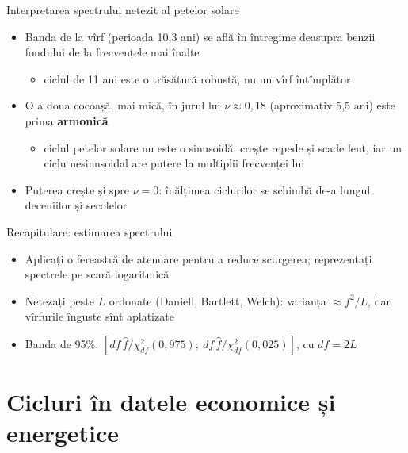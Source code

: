 \begin{frame}{Interpretarea spectrului netezit al petelor solare}
\itemsize{\small}
\begin{itemize}
    \item Banda de la vîrf (perioada 10{,}3 ani) se află în întregime deasupra benzii fondului de la frecvențele mai înalte
    \begin{itemize}
        \item ciclul de 11 ani este o trăsătură robustă, nu un vîrf întîmplător
    \end{itemize}
    \item O a doua cocoașă, mai mică, în jurul lui $\nu \approx 0{,}18$ (aproximativ 5,5 ani) este prima \textbf{armonică}
    \begin{itemize}
        \item ciclul petelor solare nu este o sinusoidă: crește repede și scade lent, iar un ciclu nesinusoidal are putere la multiplii frecvenței lui
    \end{itemize}
    \item Puterea crește și spre $\nu = 0$: înălțimea ciclurilor se schimbă de-a lungul deceniilor și secolelor
\end{itemize}
\end{frame}

\begin{frame}{Recapitulare: estimarea spectrului}
\itemsize{\small}
\begin{itemize}
    \item Aplicați o fereastră de atenuare pentru a reduce scurgerea; reprezentați spectrele pe scară logaritmică
    \item Netezați peste $L$ ordonate (Daniell, Bartlett, Welch): varianța $\approx f^2/L$, dar vîrfurile înguste sînt aplatizate
    \item Banda de 95\%: $[df\,\hat f/\chi^2_{df}(0{,}975);\ df\,\hat f/\chi^2_{df}(0{,}025)]$, cu $df = 2L$
\end{itemize}
\end{frame}


\section{Cicluri în datele economice și energetice}

